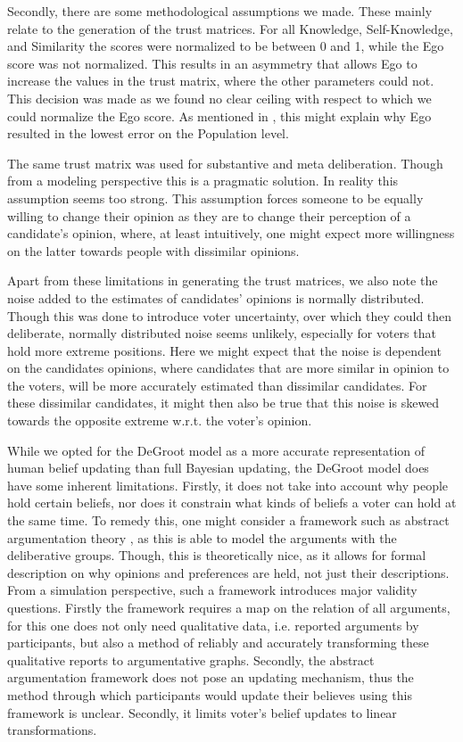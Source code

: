 Secondly, there are some methodological assumptions we made. These mainly
relate to the generation of the trust matrices. For all Knowledge,
Self-Knowledge, and Similarity the scores were normalized to be between 0 and
1, while the Ego score was not normalized. This results in an asymmetry that
allows Ego to increase the values in the trust matrix, where the other
parameters could not. This decision was made as we found no clear ceiling
with respect to which we could normalize the Ego score. As mentioned in ,
this might explain why Ego resulted in the lowest error on the Population level.

The same trust matrix was used for substantive and meta deliberation. Though
from a modeling perspective this is a pragmatic solution. In reality this
assumption seems too strong. This assumption forces someone to be equally
willing to change their opinion as they are to change their perception of a
candidate's opinion, where, at least intuitively, one might expect more
willingness on the latter towards people with dissimilar opinions.


Apart from these limitations in generating the trust matrices, we also note the
noise added to the estimates of candidates' opinions is normally distributed.
Though this was done to introduce voter uncertainty, over which they could then
deliberate, normally distributed noise seems unlikely, especially for voters
that hold more extreme positions. Here we might expect that the noise is
dependent on the candidates opinions, where candidates that are more similar in
opinion to the voters, will be more accurately estimated than dissimilar
candidates. For these dissimilar candidates, it might then also be true that
this noise is skewed towards the opposite extreme w.r.t. the voter's opinion.

While we opted for the DeGroot model as a more accurate representation of human
belief updating than full Bayesian updating, the DeGroot model does have some
inherent limitations. Firstly, it does not take into account why people hold
certain beliefs, nor does it constrain what kinds of beliefs a voter can hold
at the same time. To remedy this, one might consider a framework such as
abstract argumentation theory \cite{dungAcceptabilityArgumentsIts1995}, as
this is able to model the arguments with the deliberative groups. Though, this
is theoretically nice, as it allows for formal description on why opinions and
preferences are held, not just their descriptions. From a simulation
perspective, such a framework introduces major validity questions. Firstly the
framework requires a map on the relation of all arguments, for this one does
not only need qualitative data, i.e. reported arguments by participants, but
also a method of reliably and accurately transforming these qualitative reports
to argumentative graphs. Secondly, the abstract argumentation framework does
not pose an updating mechanism, thus the method through which participants
would update their believes using this framework is unclear. Secondly, it limits
voter's belief updates to linear transformations.



